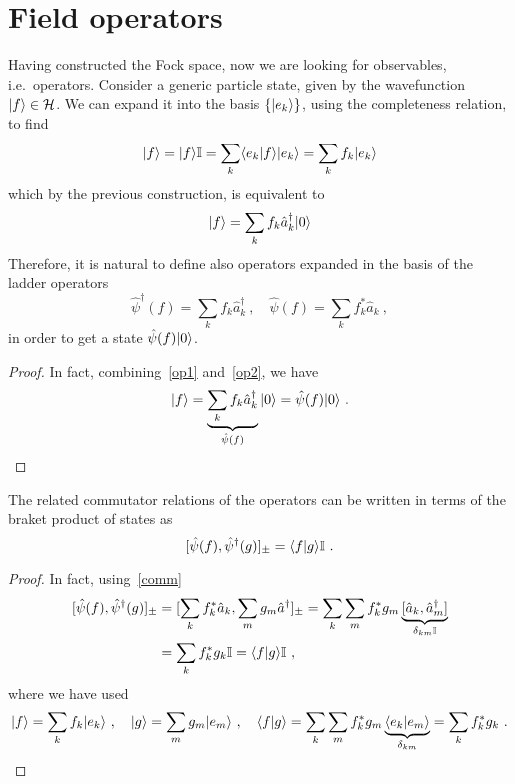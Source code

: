 \section{Field operators} 

    Having constructed the Fock space, now we are looking for observables, i.e.~operators. 
    Consider a generic particle state, given by the wavefunction $\vert f\rangle \in \mathcal H$. We can expand it into the basis $\{\vert e_k\rangle\}$, using the completeness relation, to find 
    \begin{equation*}
        \vert f\rangle = \vert f\rangle \mathbb I = \sum_k \langle e_k\vert f\rangle \vert e_k\rangle = \sum_k f_k \vert e_k\rangle
    \end{equation*}
    which by the previous construction, is equivalent to 
    \begin{equation}\label{op1}
        \vert f\rangle = \sum_k f_k \hat a_k^\dagger \vert0\rangle
    \end{equation}
    Therefore, it is natural to define also operators expanded in the basis of the ladder operators
    \begin{equation}\label{op2}
        \hat \psi^\dagger (f) = \sum_k f_k \hat a^\dagger_k ~, \quad \hat \psi (f) = \sum_k f_k^* \hat a_k ~,
    \end{equation}
    in order to get a state $\hat \psi (f) \vert0\rangle$. 
    \begin{proof}
        In fact, combining~\eqref{op1} and~\eqref{op2}, we have
        \begin{equation*}
            \vert f\rangle = \underbrace{\sum_k f_k \hat a_k^\dagger}_{\hat \psi(f)} \vert0\rangle = \hat \psi (f) \vert0\rangle ~.
        \end{equation*}
    \end{proof}
    The related commutator relations of the operators can be written in terms of the braket product of states as
    \begin{equation}\label{commf}
        [\hat \psi (f), \hat \psi^\dagger (g)]_\pm = \langle f\vert g\rangle\mathbb I ~.
    \end{equation}
    \begin{proof}
        In fact, using~\eqref{comm}
        \begin{equation*}
        \begin{aligned}
            [\hat \psi (f), \hat \psi^\dagger (g)]_\pm & = [\sum_k f^*_k \hat a_k, \sum_m g_m \hat a^\dagger]_\pm = \sum_k \sum_m f^*_k g_m \underbrace{[\hat a_k, \hat a^\dagger_m]}_{\delta_{km} \mathbb I} \\ & = \sum_k f^*_k g_k \mathbb I = \braket{f}{g} \mathbb I ~,
        \end{aligned}
        \end{equation*}
        where we have used 
        \begin{equation*}
            \vert f\rangle = \sum_k f_k \vert e_k\rangle ~, \quad \vert g\rangle = \sum_m g_m \vert e_m\rangle ~, \quad \langle f\vert g\rangle = \sum_k \sum_m f^*_k g_m \underbrace{\langle e_k\vert e_m\rangle}_{\delta_{km}} = \sum_k f^*_k g_k ~.
        \end{equation*}
    \end{proof}
    
